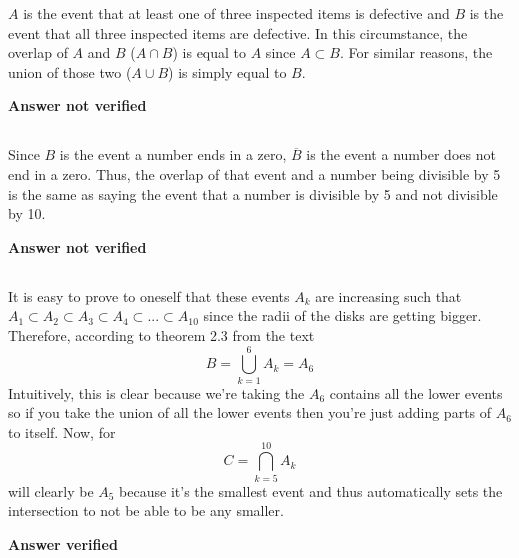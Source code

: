 $A$ is the event that at least one of three inspected items is defective and $B$ is the event that all three inspected items are defective.  In this circumstance, the overlap of $A$ and $B$ ($A \cap B$) is equal to $A$ since $A \subset B$.  For similar reasons, the union of those two ($A \cup B$) is simply equal to $B$.


\textbf{Answer not verified}

\subsection{}

Since $B$ is the event a number ends in a zero, $\overline{B}$ is the event a number does not end in a zero.  Thus, the overlap of that event and a number being divisible by 5 is the same as saying the event that a number is divisible by 5 and not divisible by 10.


\textbf{Answer not verified}

\subsection{}

It is easy to prove to oneself that these events $A_k$ are increasing such that $A_1 \subset A_2 \subset A_3 \subset A_4 \subset ... \subset A_10$ since the radii of the disks are getting bigger.  Therefore, according to theorem 2.3 from the text
\begin{equation}
	B = \bigcup_{k=1}^6 A_k = A_6
\end{equation}
Intuitively, this is clear because we're taking the $A_6$ contains all the lower events so if you take the union of all the lower events then you're just adding parts of $A_6$ to itself.  Now, for
\begin{equation}
	C = \bigcap_{k=5}^{10} A_k
\end{equation}
will clearly be $A_5$ because it's the smallest event and thus automatically sets the intersection to not be able to be any smaller.

\textbf{Answer verified}


